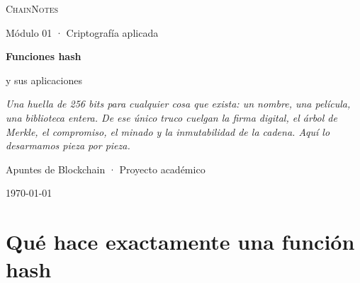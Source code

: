 \documentclass[11pt,a4paper]{article}
\theoremstyle{definition}
\theoremstyle{plain}
\theoremstyle{remark}
\begin{document}

\makeatletter
\DeclareRobustCommand{\%}{\char`\%\relax}
\makeatother

\begin{titlepage}
\centering
\vspace*{2.5cm}

{\Large\color{violetdeep}\textsc{ChainNotes}\par}
{\small\color{inkc}Módulo 01 · Criptografía aplicada\par}

\vspace{1.4cm}
{\Huge\bfseries Funciones hash\par}
\vspace{0.4cm}
{\LARGE y sus aplicaciones\par}

\vspace{1.2cm}
\begin{minipage}{0.78\textwidth}
\centering\itshape\color{inkc}
Una huella de 256 bits para cualquier cosa que exista: un nombre, una película,
una biblioteca entera. De ese único truco cuelgan la firma digital, el árbol de
Merkle, el compromiso, el minado y la inmutabilidad de la cadena. Aquí lo
desarmamos pieza por pieza.
\end{minipage}

\vspace{1.6cm}

\vfill
{\small Apuntes de Blockchain · Proyecto académico\par}
{\small\color{inkc}\today\par}
\end{titlepage}

\tableofcontents
\clearpage

\section{Qué hace exactamente una función hash}
\end{document}
